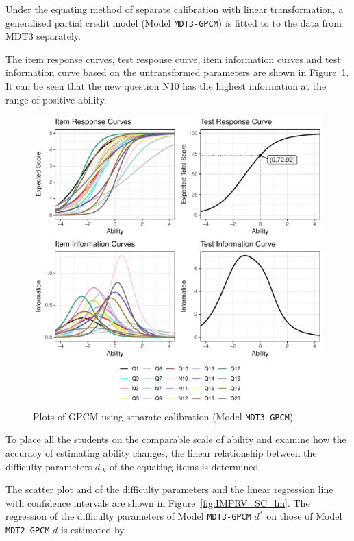 \documentclass[a4paper]{report}
\begin{document}
Under the equating method of separate calibration with linear transformation, a generalised partial credit model (Model \texttt{MDT3-GPCM}) is fitted to to the data from MDT3 separately. 

The item response curves, test response curve, item information curves and test information curve based on the untransformed parameters are shown in Figure~\ref{fig:IMPRV_17}. It can be seen that the new question N10 has the highest information at the range of positive ability. 

\begin{figure}[H]
  \centering
  \includegraphics[width=\linewidth]{fig/IMPRV_17.pdf}
  \caption{\label{fig:IMPRV_17}Plots of GPCM using separate calibration (Model \texttt{MDT3-GPCM})}
\end{figure}

To place all the students on the comparable scale of ability and examine how the accuracy of estimating ability changes, the linear relationship between the difficulty parameters $d_{ik}$ of the equating items is determined. 

The scatter plot and of the difficulty parameters and the linear regression line with confidence intervals are shown in Figure~\ref{fig:IMPRV_SC_lm}. The regression of the difficulty parameters of Model \texttt{MDT3-GPCM} $d^*$ on those of Model \texttt{MDT2-GPCM} $d$ is estimated by 
\end{document}

